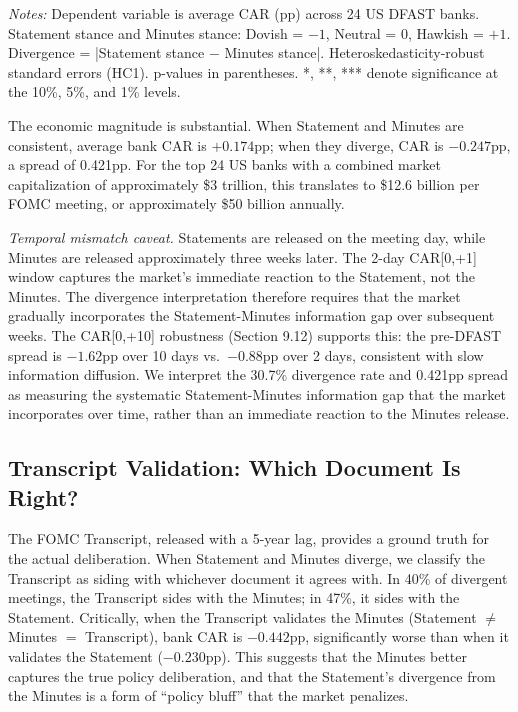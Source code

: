 \documentclass[12pt,a4paper]{article}
\begin{document}
\noindent\textit{Notes:} Dependent variable is average CAR (pp) across 24 US DFAST banks. Statement stance and Minutes stance: Dovish = $-1$, Neutral = 0, Hawkish = $+1$. Divergence = |Statement stance $-$ Minutes stance|. Heteroskedasticity-robust standard errors (HC1). p-values in parentheses. *, **, *** denote significance at the 10\%, 5\%, and 1\% levels.

The economic magnitude is substantial. When Statement and Minutes are consistent, average bank CAR is $+0.174$pp; when they diverge, CAR is $-0.247$pp, a spread of 0.421pp. For the top 24 US banks with a combined market capitalization of approximately \$3 trillion, this translates to \$12.6 billion per FOMC meeting, or approximately \$50 billion annually.

\textit{Temporal mismatch caveat.} Statements are released on the meeting day, while Minutes are released approximately three weeks later. The 2-day CAR[0,+1] window captures the market's immediate reaction to the Statement, not the Minutes. The divergence interpretation therefore requires that the market gradually incorporates the Statement-Minutes information gap over subsequent weeks. The CAR[0,+10] robustness (Section 9.12) supports this: the pre-DFAST spread is $-1.62$pp over 10 days vs.\ $-0.88$pp over 2 days, consistent with slow information diffusion. We interpret the 30.7\% divergence rate and 0.421pp spread as measuring the systematic Statement-Minutes information gap that the market incorporates over time, rather than an immediate reaction to the Minutes release.

\subsection{Transcript Validation: Which Document Is Right?}

The FOMC Transcript, released with a 5-year lag, provides a ground truth for the actual deliberation. When Statement and Minutes diverge, we classify the Transcript as siding with whichever document it agrees with. In 40\% of divergent meetings, the Transcript sides with the Minutes; in 47\%, it sides with the Statement. Critically, when the Transcript validates the Minutes (Statement $\neq$ Minutes $=$ Transcript), bank CAR is $-0.442$pp, significantly worse than when it validates the Statement ($-0.230$pp). This suggests that the Minutes better captures the true policy deliberation, and that the Statement's divergence from the Minutes is a form of ``policy bluff'' that the market penalizes.
\end{document}
